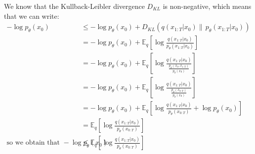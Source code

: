 \documentclass{article}
\numberwithin{equation}{section}
\numberwithin{figure}{section}
\begin{document}
{
  \allowdisplaybreaks
We know that the Kullback-Leibler divergence $D_{KL}$ is non-negative, which means that we can write:
\begin{align}
    - \log p_{\theta}\left(x_0\right) &\leq - \log p_{\theta}\left(x_0\right) + D_{KL}\left(q\left(x_{1:T}|x_0\right) \| \, p_{\theta}\left(x_{1:T}|x_0\right)\right) \\[10pt]
    &= - \log p_{\theta}\left(x_0\right) + \mathbb{E}_q \left[\log \frac{q\left(x_{1:T}|x_0\right)}{p_{\theta}\left(x_{1:T}|x_0\right)}\right] \\[10pt]
    &= - \log p_{\theta}\left(x_0\right) + \mathbb{E}_q \left[\log \frac{q\left(x_{1:T}|x_0\right)}{\frac{p_{\theta}\left(x_0, x_{1:T}\right)}{p_{\theta}\left(x_0\right)}}\right] \\[10pt]
    &= - \log p_{\theta}\left(x_0\right) + \mathbb{E}_q \left[\log \frac{q\left(x_{1:T}|x_0\right)}{\frac{p_{\theta}\left(x_{0:T}\right)}{p_{\theta}\left(x_0\right)}}\right] \\[10pt]
    &= - \log p_{\theta}\left(x_0\right) + \mathbb{E}_q \left[\log \frac{q\left(x_{1:T}|x_0\right)}{p_{\theta}\left(x_{0:T}\right)} + \log {p_{\theta}\left(x_0\right)}\right] \\[10pt]
    &= \mathbb{E}_q \left[\log \frac{q\left(x_{1:T}|x_0\right)}{p_{\theta}\left(x_{0:T}\right)}\right] \\
    \text{so we obtain that } - \log p_{\theta}\left(x_0\right) &\leq \mathbb{E}_q \left[\log \frac{q\left(x_{1:T}|x_0\right)}{p_{\theta}\left(x_{0:T}\right)}\right]
\end{align}

}
\end{document}
